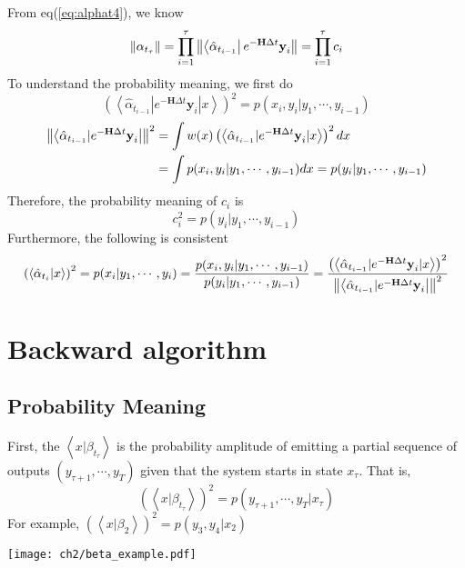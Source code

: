 \begin{definition}
From eq(\ref{eq:alphat4}), we know
\begin{equation}
        \left\lVert\alpha_{t_{\tau}}\right\rVert = \prod_{i=1}^{\tau} \left\lVert\left < \hat{\alpha}_{t_{i-1}} \right| e^{-\textbf{H}\Delta t} \textbf{y}_i\right\rVert = \prod_{i=1}^{\tau} c_i
\end{equation}
To understand the probability meaning, we first do 
\begin{equation}
        \left(\left < \hat{\alpha}_{t_{i-1}} | e^{-\textbf{H}\Delta t} \textbf{y}_{i} | x \right>\right)^2 = p(x_{i},y_{i}|y_1,\cdots,y_{i-1})   
\end{equation}
\begin{equation}
\begin{split}       
        \left\lVert\left < \hat{\alpha}_{t_{i-1}} | e^{-\textbf{H}\Delta t} \textbf{y}_{i} \right|\right\rVert^2 &= \int w(x) \left(\left < \hat{\alpha}_{t_{i-1}} | e^{-\textbf{H}\Delta t} \textbf{y}_{i} | x \right>\right)^2 dx \\
        &= \int p(x_{i},y_{i}|y_1,\cdots,y_{i-1}) dx = p(y_i | y_1,\cdots,y_{i-1})
\end{split}
\end{equation}
Therefore, the probability meaning of $c_i$ is 
\begin{equation}
        c_i^2 = p(y_i | y_1,\cdots,y_{i-1})
\label{eq:scalefactor} 
\end{equation}
Furthermore, the following is consistent
\begin{equation}
        \left(\left < \hat{\alpha}_{t_i} | x \right>\right)^2 =  p(x_{i}|y_1,\cdots,y_{i})  = 
        \frac{p(x_{i},y_{i}|y_1,\cdots,y_{i-1})}{p(y_i | y_1,\cdots,y_{i-1})} = \frac{  \left(\left < \hat{\alpha}_{t_{i-1}} | e^{-\textbf{H}\Delta t} \textbf{y}_{i} | x \right>\right)^2 }{ \left\lVert\left < \hat{\alpha}_{t_{i-1}} | e^{-\textbf{H}\Delta t} \textbf{y}_{i} \right|\right\rVert^2 } 
\end{equation}
\end{definition}

\section{Backward algorithm}
\subsection{Probability Meaning}
First, the $ \left<x|\beta_{t_{\tau}} \right>$ is the probability amplitude of emitting a partial sequence of outputs $(y_{\tau+1},\cdots,y_{T})$ given that the system starts in state $x_{\tau}$. That is,
\begin{equation}
        (\left<x|\beta_{t_{\tau}} \right>)^2 = p(y_{\tau+1},\cdots,y_{T}|x_{\tau})
\end{equation}
For example, $(\left<x|\beta_{2} \right>)^2 = p(y_3, y_4|x_2)$
\begin{center}
        \texttt{[image: ch2/beta\_example.pdf]}
\end{center}

